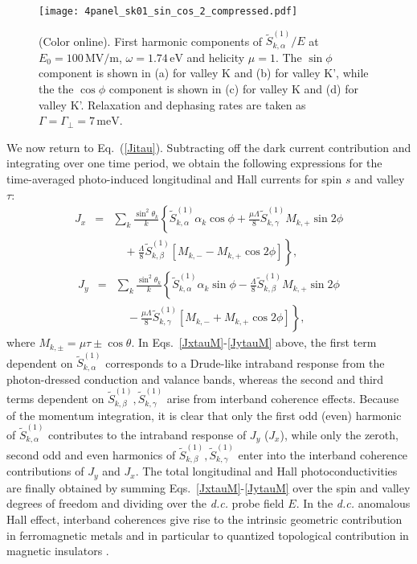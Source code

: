 \documentclass[reprint,amsmath,amssymb,aps,prb]{revtex4-1}
\begin{document}
%
\begin{figure}[htb]
  \texttt{[image: 4panel\_sk01\_sin\_cos\_2\_compressed.pdf]}
  \caption{(Color online). First harmonic components of $\tilde{S}_{k,\alpha}^{(1)}/E$ at $E_0 = 100\,\mathrm{MV/m}$, $\omega = 1.74\,\mathrm{eV}$ and  helicity $\mu=1$. The $\sin\phi$ component is shown in (a) for valley K and (b) for valley K', while the the $\cos\phi$ component is shown in (c) for valley K and (d) for valley K'. Relaxation and dephasing rates are taken as $\Gamma = \Gamma_{\perp} = 7\,\mathrm{meV}$. } \label{sincos}
\end{figure}
%
We now return to Eq.~(\ref{Jitau}). Subtracting off the dark current contribution and integrating over one time period,  
we obtain the following expressions for the time-averaged 
photo-induced longitudinal and Hall currents for spin $s$ and valley $\tau$:
%
\begin{eqnarray} 
 J_{x} 
&=&\sum_k\frac{\sin^2\theta_k}{k}\left\{\tilde{S}_{k,\alpha}^{(1)}\alpha_k\cos\phi+\frac{\mu\Lambda}{8}\tilde{S}_{k,\gamma}^{(1)}M_{k,+}\sin2\phi \right.\label{JxtauM} \nonumber \\
&&\left.\quad+\frac{\Lambda}{8}\tilde{S}_{k,\beta}^{(1)} \left[M_{k,-}-M_{k,+}\cos2\phi\right]\right\}, 
\end{eqnarray}
%
\begin{eqnarray}
 J_{y} &=&\sum_k\frac{\sin^2\theta_k}{k}\left\{\tilde{S}_{k,\alpha}^{(1)}\alpha_k\sin\phi-\frac{\Lambda}{8}\tilde{S}_{k,\beta}^{(1)} M_{k,+}\sin2\phi\right. \label{JytauM} \nonumber \\
&&\left.\quad-\frac{\mu\Lambda}{8}\tilde{S}_{k,\gamma}^{(1)}\left[M_{k,-}+M_{k,+}\cos2\phi\right]\right\},
\end{eqnarray}
%
where $M_{k,\pm}= \mu\tau\pm\cos\theta$. In Eqs.~\eqref{JxtauM}-\eqref{JytauM} above, the first term dependent on $\tilde{S}_{k,\alpha}^{(1)}$ corresponds to a Drude-like intraband response from the  photon-dressed conduction and valance bands, whereas the second and third terms dependent on $\tilde{S}_{k,\beta}^{(1)}, \tilde{S}_{k,\gamma}^{(1)}$ arise from interband coherence effects. Because of the momentum integration, it is clear that only the first odd (even) harmonic of $\tilde{S}_{k,\alpha}^{(1)}$ contributes to the intraband response of $J_y$ ($J_x$), while only the zeroth, second odd and even harmonics of $\tilde{S}_{k,\beta}^{(1)}, \tilde{S}_{k,\gamma}^{(1)}$ enter into the interband coherence contributions of $J_y$ and $J_x$. The total longitudinal and Hall photoconductivities are finally obtained by summing Eqs.~\eqref{JxtauM}-\eqref{JytauM} over the spin and valley degrees of freedom and dividing over the \textit{d.c.} probe field $E$. In  the \textit{d.c.} anomalous Hall effect, interband coherences give rise to the intrinsic geometric contribution in ferromagnetic metals and in particular to quantized topological contribution in magnetic insulators \cite{AHE_RMP,AHE_Rev2}. 
\end{document}
